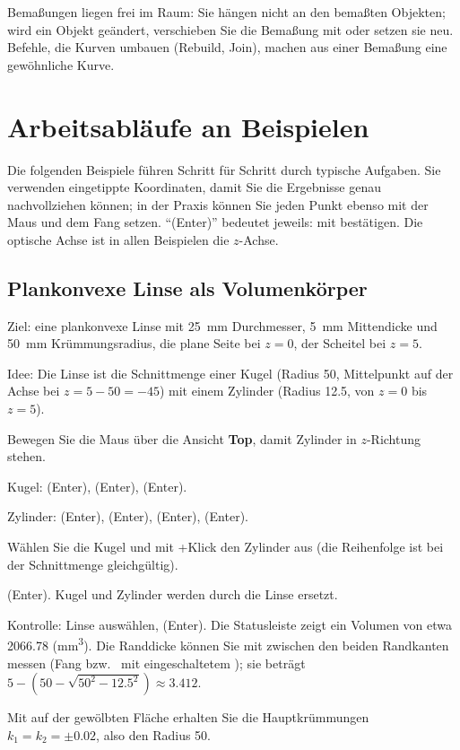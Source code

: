 Bemaßungen liegen frei im Raum: Sie hängen nicht an den bemaßten Objekten; wird ein Objekt
geändert, verschieben Sie die Bemaßung mit oder setzen sie neu. Befehle, die Kurven umbauen
(Rebuild, Join), machen aus einer Bemaßung eine gewöhnliche Kurve.

\section{Arbeitsabläufe an Beispielen}\label{sec:mod-beispiele}

Die folgenden Beispiele führen Schritt für Schritt durch typische Aufgaben. Sie verwenden
eingetippte Koordinaten, damit Sie die Ergebnisse genau nachvollziehen können; in der Praxis
können Sie jeden Punkt ebenso mit der Maus und dem Fang setzen. \enquote{(Enter)} bedeutet
jeweils: mit  bestätigen. Die optische Achse ist in allen Beispielen die $z$-Achse.

\subsection{Plankonvexe Linse als Volumenkörper}\label{sec:bsp-linse}

Ziel: eine plankonvexe Linse mit \SI{25}{mm} Durchmesser, \SI{5}{mm} Mittendicke und
\SI{50}{mm} Krümmungsradius, die plane Seite bei $z=0$, der Scheitel bei $z=5$.

Idee: Die Linse ist die Schnittmenge einer Kugel (Radius 50, Mittelpunkt auf der Achse bei
$z = 5 - 50 = -45$) mit einem Zylinder (Radius 12.5, von $z=0$ bis $z=5$).

\begin{schritte}
\item Bewegen Sie die Maus über die Ansicht \textbf{Top}, damit Zylinder in $z$-Richtung
  stehen.
\item Kugel:  (Enter),  (Enter),  (Enter).
\item Zylinder:  (Enter),  (Enter),  (Enter), 
  (Enter).
\item Wählen Sie die Kugel und mit +Klick den Zylinder aus (die Reihenfolge ist bei
  der Schnittmenge gleichgültig).
\item {} (Enter). Kugel und Zylinder werden durch die Linse ersetzt.
\item Kontrolle: Linse auswählen,  (Enter). Die Statusleiste zeigt ein Volumen von
  etwa \num{2066.78} (\si{\cubic\milli\metre}). Die Randdicke können Sie mit 
  zwischen den beiden Randkanten messen (Fang  bzw.\  mit eingeschaltetem
  ); sie beträgt $5 - (50 - \sqrt{50^2 - 12.5^2}) \approx \num{3.412}$.
\item Mit  auf der gewölbten Fläche erhalten Sie die Hauptkrümmungen
  $k_1 = k_2 = \pm 0.02$, also den Radius 50.
\end{schritte}

